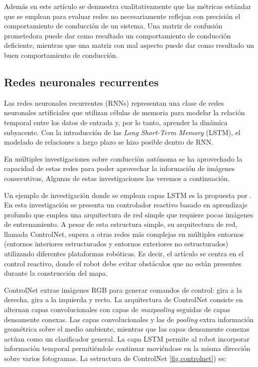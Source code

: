 Además en este artículo se demuestra cualitativamente que las métricas estándar que se emplean para evaluar redes no necesariamente reflejan con precisión el comportamiento de conducción de un sistema. Una matriz de confusión prometedora puede dar como resultado un comportamiento de conducción deficiente, mientras que una matriz con mal aspecto puede dar como resultado un buen comportamiento de conducción.

\subsection{Redes neuronales recurrentes}

Las redes neuronales recurrentes (RNNs) representan una clase de redes neuronales artificiales que utilizan células de memoria para modelar la relación temporal entre los datos de entrada y, por lo tanto, aprender la dinámica subyacente. Con la introducción de las \textit{Long Short-Term Memory} (LSTM), el modelado de relaciones a largo plazo se hizo posible dentro de RNN.

En múltiples investigaciones sobre conducción autónoma se ha aprovechado la capacidad de estas redes para poder aprovechar la información de imágenes consecutivas, Algunas de estas investigaciones las veremos a continuación.

Un ejemplo de investigación donde se emplean capas LSTM es la propuesta por \cite{reactive-ground}. En esta investigación se presenta un controlador reactivo basado en aprendizaje profundo que emplea una arquitectura de red simple que requiere pocas imágenes de entrenamiento. A pesar de esta estructura simple, su arquitectura de red, llamada ControlNet, supera a otras redes más complejas en múltiples entornos (entornos interiores estructurados y entornos exteriores no estructurados) utilizando diferentes plataformas robóticas. Es decir, el artículo se centra en el control reactivo, donde el robot debe evitar obstáculos que no están presentes durante la construcción del mapa.

ControlNet extrae imágenes RGB para generar comandos de control: gira a la derecha, gira a la izquierda y recto. La arquitectura de ControlNet consiste en alternan capas convolucionales con capas de \textit{maxpooling} seguidas de capas densamente conexas. Las capas convolucionales y las de \textit{pooling} extra información geométrica sobre el medio ambiente, mientras que las capas densamente conexas actúan como un clasificador general. La capa LSTM permite al robot incorporar información temporal permitiéndole continuar moviéndose en la misma dirección sobre varios fotogramas. La estructura de ControlNet \ref{fig.controlnet}) es:

